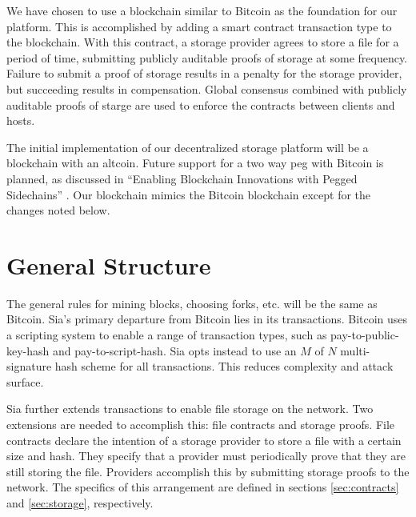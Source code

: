 \documentclass[twocolumn]{article}
\begin{document}
We have chosen to use a blockchain similar to Bitcoin \cite{btc, btcdg} as the foundation for our platform.
This is accomplished by adding a smart contract transaction type to the blockchain.
With this contract, a storage provider agrees to store a file for a period of time, submitting publicly auditable proofs of storage at some frequency.
Failure to submit a proof of storage results in a penalty for the storage provider, but succeeding results in compensation.
Global consensus combined with publicly auditable proofs of starge are used to enforce the contracts between clients and hosts.

The initial implementation of our decentralized storage platform will be a blockchain with an altcoin.
Future support for a two way peg with Bitcoin is planned, as discussed in ``Enabling Blockchain Innovations with Pegged Sidechains'' \cite{side}.
Our blockchain mimics the Bitcoin blockchain except for the changes noted below.

\section{General Structure}
The general rules for mining blocks, choosing forks, etc. will be the same as Bitcoin.
Sia's primary departure from Bitcoin lies in its transactions.
Bitcoin uses a scripting system to enable a range of transaction types, such as pay-to-public-key-hash and pay-to-script-hash.
Sia opts instead to use an $M$ of $N$ multi-signature hash scheme for all transactions.
This reduces complexity and attack surface.

Sia further extends transactions to enable file storage on the network.
Two extensions are needed to accomplish this: file contracts and storage proofs.
File contracts declare the intention of a storage provider to store a file with a certain size and hash.
They specify that a provider must periodically prove that they are still storing the file.
Providers accomplish this by submitting storage proofs to the network.
The specifics of this arrangement are defined in sections \ref{sec:contracts} and \ref{sec:storage}, respectively.
\end{document}
